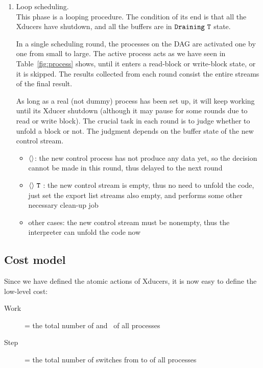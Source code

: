 \begin{enumerate}[(1)]
\begin{itemize}
\end{itemize}


\item Loop scheduling. \\ 
This phase is a looping procedure. The condition of its end is that all the Xducers have shutdown, and all the buffers are in $\texttt{Draining} \  \mathtt{T}$ state. 

In a single scheduling round, the processes on the DAG are activated one by one from small to large.
The active process acts as we have seen in Table~\ref{fig:process} shows, until it enters a read-block or write-block state, or it is skipped.  
The results collected from each round consist the entire streams of the final result.

As long as a real (not dummy) process has been set up, it will keep working until its Xducer shutdown (although it may pause for some rounds due to read or write block). 
The crucial task in each round is to judge whether to unfold a \wc block or not. The judgment depends on the buffer state of the new control stream.

\begin{itemize}
	\item \filling$\langle \rangle$: the new control process has not produce any data yet, so the decision cannot be made in this round, thus delayed to the next round
	\item \draining$\langle \rangle \ \mathtt{T}$ : the new control stream is empty, thus no need to unfold the code, just set the export list streams also empty, and performs some other necessary clean-up job  
	\item other cases: the new control stream must be nonempty, thus the interpreter can unfold the code now
\end{itemize}







	
\end{enumerate}

\subsection{Cost model}
Since we have defined the atomic actions of Xducers, it is now easy to define the low-level cost:
\begin{description}
	\item[Work] = the total number of \pin and \pout \  of all processes
	\item[Step] = the total number of switches from \filling to \draining of all processes
\end{description}


